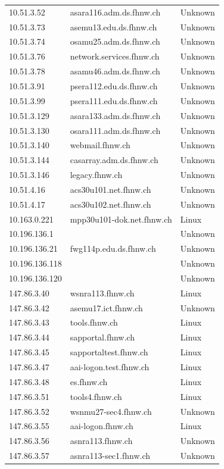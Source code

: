 \documentclass[a4paper,11pt]{scrartcl}
\begin{document}
\begin{longtable}{p{2.5cm}|p{8cm}|l}
	10.51.3.52 & asara116.adm.ds.fhnw.ch & Unknown\\
	10.51.3.73 & asemu13.edu.ds.fhnw.ch & Unknown\\
	10.51.3.74 & osamu25.adm.ds.fhnw.ch & Unknown\\
	10.51.3.76 & network.services.fhnw.ch & Unknown\\
	10.51.3.78 & asamu46.adm.ds.fhnw.ch & Unknown\\
	10.51.3.91 & psera112.edu.ds.fhnw.ch & Unknown\\
	10.51.3.99 & psera111.edu.ds.fhnw.ch & Unknown\\
	10.51.3.129 & asara133.adm.ds.fhnw.ch & Unknown\\
	10.51.3.130 & osara111.adm.ds.fhnw.ch & Unknown\\
	10.51.3.140 & webmail.fhnw.ch & Unknown\\
	10.51.3.144 & casarray.adm.ds.fhnw.ch & Unknown\\
	10.51.3.146 & legacy.fhnw.ch & Unknown\\
	10.51.4.16 & acs30u101.net.fhnw.ch & Unknown\\
	10.51.4.17 & acs30u102.net.fhnw.ch & Unknown\\
	10.163.0.221 & mpp30u101-dok.net.fhnw.ch & Linux\\
	10.196.136.1 &  & Unknown\\
	10.196.136.21 & fwg114p.edu.ds.fhnw.ch & Unknown\\
	10.196.136.118 &  & Unknown\\
	10.196.136.120 &  & Unknown\\
	147.86.3.40 & wsnra113.fhnw.ch & Linux\\
	147.86.3.42 & asemu17.ict.fhnw.ch & Unknown\\
	147.86.3.43 & tools.fhnw.ch & Linux\\
	147.86.3.44 & sapportal.fhnw.ch & Linux\\
	147.86.3.45 & sapportaltest.fhnw.ch & Linux\\
	147.86.3.47 & aai-logon.test.fhnw.ch & Linux\\
	147.86.3.48 & es.fhnw.ch & Linux\\
	147.86.3.51 & tools4.fhnw.ch & Linux\\
	147.86.3.52 & wsnmu27-sec4.fhnw.ch & Unknown\\
	147.86.3.55 & aai-logon.fhnw.ch & Linux\\
	147.86.3.56 & asnra113.fhnw.ch & Unknown\\
	147.86.3.57 & asnra113-sec1.fhnw.ch & Unknown\\

\end{longtable}
\end{document}
